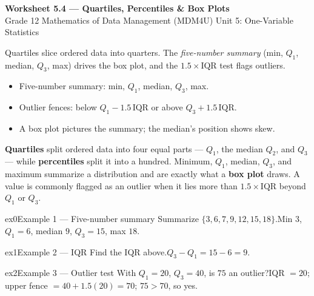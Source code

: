 \documentclass[11pt]{article}
\begin{document}
\begin{center}
{\LARGE\bfseries\color{titleblue}Worksheet 5.4 --- Quartiles, Percentiles \& Box Plots}\\[2pt]
{\small Grade 12 Mathematics of Data Management (MDM4U) \textperiodcentered{} Unit 5: One-Variable Statistics}
\end{center}

\begin{ideabox}
Quartiles slice ordered data into quarters. The \emph{five-number summary} (min, $Q_1$, median, $Q_3$, max) drives the box plot, and the $1.5\times\text{IQR}$ test flags outliers.
\begin{itemize}[leftmargin=*,itemsep=2pt]
  \item Five-number summary: min, $Q_1$, median, $Q_3$, max.
  \item Outlier fences: below $Q_1-1.5\,\text{IQR}$ or above $Q_3+1.5\,\text{IQR}$.
  \item A box plot pictures the summary; the median's position shows skew.
\end{itemize}
\end{ideabox}

\begin{learnbox}
\textbf{Quartiles} split ordered data into four equal parts — $Q_1$, the median $Q_2$, and $Q_3$ — while \textbf{percentiles} split it into a hundred.
Minimum, $Q_1$, median, $Q_3$, and maximum summarize a distribution and are exactly what a \textbf{box plot} draws.
A value is commonly flagged as an outlier when it lies more than $1.5\times\mathrm{IQR}$ beyond $Q_1$ or $Q_3$.
\end{learnbox}


\begin{example}{ex0}{Example 1 --- Five-number summary}
Summarize $\{3,6,7,9,12,15,18\}$.\soln Min $3$, $Q_1=6$, median $9$, $Q_3=15$, max $18$.
\end{example}

\begin{example}{ex1}{Example 2 --- IQR}
Find the IQR above.\soln $Q_3-Q_1=15-6=9$.
\end{example}

\begin{example}{ex2}{Example 3 --- Outlier test}
With $Q_1=20$, $Q_3=40$, is $75$ an outlier?\soln IQR $=20$; upper fence $=40+1.5(20)=70$; $75>70$, so yes.
\end{example}
\end{document}

